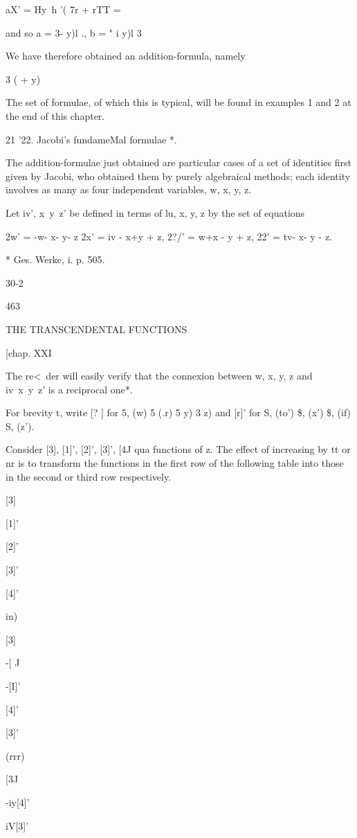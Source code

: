 aX' = Hy\ h '( 7r + rTT = %

and so a = 3- y)l ., b = " i y)l 3\

We have therefore obtained an addition-formula, namely

 3 ( + y) %

The set of formulae, of which this is typical, will be found in
examples 1 and 2 at the end of this chapter.

21 '22. Jacobi's fundameMal formulae *.

The addition-formulae just obtained are particular cases of a set of
identities first given by Jacobi, who obtained them by purely
algebraical methods; each identity involves as many as four
independent variables, w, x, y, z.

Let iv', x\ y\ z' be defined in terms of lu, x, y, z by the set of
equations

2w' = -w- x- y- z 2x' = iv - x+y + z, 2?/' = w+x - y + z, 22' = tv- x-
y - z.

* Ges. Werke, i. p. 505.

30-2

463

THE TRANSCENDENTAL FUNCTIONS

[chap. XXI

The re<\ der will easily verify that the connexion between w, x, y, z
and iv\ x\ y\ z' is a reciprocal one*.

For brevity t, write [? ] for 5, (w) 5 (.r) 5 y) 3 z) and [r]' for S,
(to') \$, (x') \$, (if) S, (z').

Consider [3], [1]', [2]', [3]', [4J qua functions of z. The effect of
increasing by tt or nr is to transform the functions in the first row
of the following table into those in the second or third row
respectively.

[3]

[1]'

[2]'

[3]'

[4]'

in)

[3]

-[ J

-[I]'

[4]'

[3]'

(rrr)

 [3J

-iy[4]'

iV[3]'

